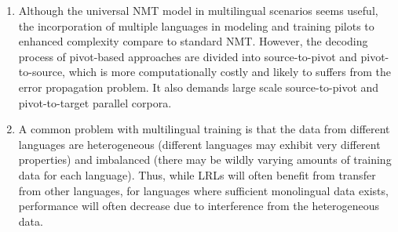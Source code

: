 \documentclass[manuscript,screen]{acmart}
\begin{document}
\begin{enumerate}
    \item Although the universal NMT model in multilingual scenarios seems useful, the incorporation of multiple languages in modeling and training pilots to enhanced complexity compare to standard NMT. However, the decoding process of pivot-based approaches are divided into source-to-pivot and pivot-to-source, which is more computationally costly and likely to suffers from the error propagation problem. It also demands large scale source-to-pivot and pivot-to-target parallel corpora.
    \item A common problem with multilingual training is that the data from different languages are heterogeneous (different languages may exhibit very different properties) and imbalanced (there may be wildly varying amounts of training data for each language). Thus, while LRLs will often benefit from transfer from other languages, for languages where sufficient monolingual data exists, performance will often decrease due to interference from the heterogeneous data.
\end{enumerate}
\end{document}
